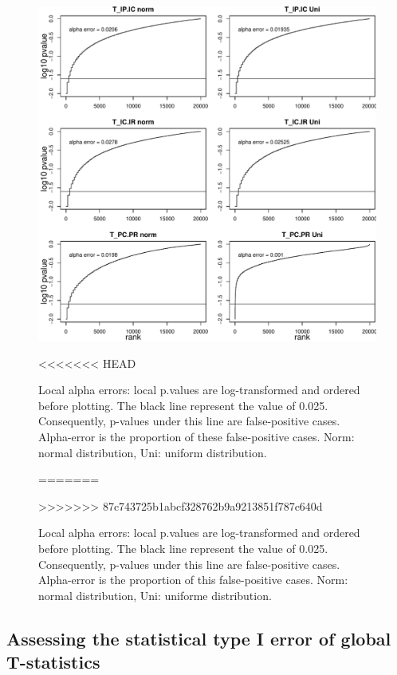 \documentclass[12pt]{article}\usepackage[]{graphicx}\usepackage[]{color}
\makeatletter
\def\maxwidth{ %
  \ifdim\Gin@nat@width>\linewidth
    \linewidth
  \else
    \Gin@nat@width
  \fi
}
\newenvironment{knitrout}{}{} %
\makeatother
\begin{document}
\begin{landscape}
\begin{knitrout}
\begin{figure}
{\centering \includegraphics[width=\maxwidth]{figure/No_Filter_results-1} 

}

<<<<<<< HEAD
\caption[Local alpha errors]{Local alpha errors: local p.values are log-transformed and ordered before plotting. The black line represent the value of 0.025. Consequently, p-values under this line are false-positive cases. Alpha-error is the proportion of these false-positive cases. Norm: normal distribution, Uni: uniform distribution.}\label{fig:No_Filter_results}
=======
\caption[Local alpha errors]{Local alpha errors: local p.values are log-transformed and ordered before plotting. The black line represent the value of 0.025. Consequently, p-values under this line are false-positive cases. Alpha-error is the proportion of this false-positive cases. Norm: normal distribution, Uni: uniforme distribution.}\label{fig:No_Filter_results}
>>>>>>> 87c743725b1abcf328762b9a9213851f787c640d
\end{figure}


\end{knitrout}

 \subsection {Assessing the statistical type I error of global T-statistics}


\end{landscape}
\end{document}
